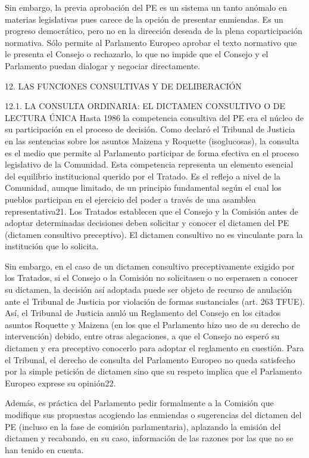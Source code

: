 \documentclass[10pt,a4paper]{article}
\begin{document}
Sin embargo, la previa aprobación del PE es un sistema un tanto anómalo en materias legislativas pues carece de la opción de presentar enmiendas. Es un progreso democrático, pero no en la dirección deseada de la plena coparticipación normativa. Sólo permite al Parlamento Europeo aprobar el texto normativo que le presenta el Consejo o rechazarlo, lo que no impide que el Consejo y el Parlamento puedan dialogar y negociar directamente.


12. LAS FUNCIONES CONSULTIVAS Y DE DELIBERACIÓN

12.1. LA CONSULTA ORDINARIA: EL DICTAMEN CONSULTIVO O DE LECTURA ÚNICA
Hasta 1986 la competencia consultiva del PE era el núcleo de su participación en el proceso de decisión. Como declaró el Tribunal de Justicia en las sentencias sobre los asuntos Maizena y Roquette (isoglucosas), la consulta es el medio que permite al Parlamento participar de forma efectiva en el proceso legislativo de la Comunidad. Esta competencia representa un elemento esencial del equilibrio institucional querido por el Tratado. Es el reflejo a nivel de la Comunidad, aunque limitado, de un principio fundamental según el cual los pueblos participan en el ejercicio del poder a través de una asamblea representativa21. Los Tratados establecen que el Consejo y la Comisión antes de adoptar determinadas decisiones deben solicitar y conocer el dictamen del PE (dictamen consultivo preceptivo). El dictamen consultivo no es vinculante para la institución que lo solicita.

Sin embargo, en el caso de un dictamen consultivo preceptivamente exigido por los Tratados, si el Consejo o la Comisión no solicitasen o no esperasen a conocer su dictamen, la decisión así adoptada puede ser objeto de recurso de anulación ante el Tribunal de Justicia por violación de formas sustanciales (art. 263 TFUE). Así, el Tribunal de Justicia anuló un Reglamento del Consejo en los citados asuntos Roquette y Maizena (en los que el Parlamento hizo uso de su derecho de intervención) debido, entre otras alegaciones, a que el Consejo no esperó su dictamen y era preceptivo conocerlo para adoptar el reglamento en cuestión. Para el Tribunal, el derecho de consulta del Parlamento Europeo no queda satisfecho por la simple petición de dictamen sino que su respeto implica que el Parlamento Europeo exprese su opinión22.

Además, es práctica del Parlamento pedir formalmente a la Comisión que modifique sus propuestas acogiendo las enmiendas o sugerencias del dictamen del PE (incluso en la fase de comisión parlamentaria), aplazando la emisión del dictamen y recabando, en su caso, información de las razones por las que no se han tenido en cuenta.
\end{document}
